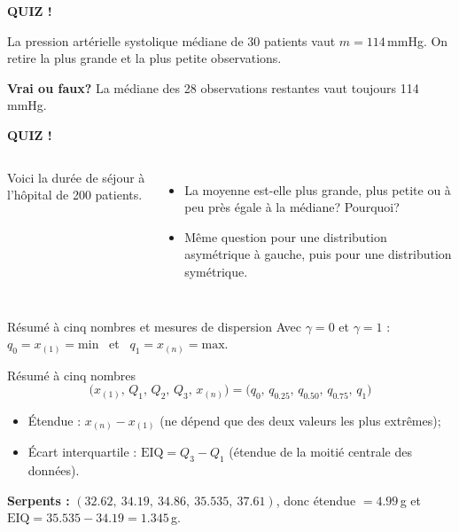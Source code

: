 \documentclass{BeamerTemplate}
\begin{document}
\begin{frame}[plain,t]
  \centerline{\LARGE\bfseries\alert{QUIZ !}}

  \medskip
  La pression artérielle systolique \alert{médiane} de 30 patients vaut
  $m = 114$\,mmHg. On retire la plus grande et la plus petite observations.

  \bigskip
  \textbf{Vrai ou faux?} La médiane des 28 observations restantes vaut
  toujours 114\,mmHg.

  \vspace{3cm}
\end{frame}

\begin{frame}[plain,t]
  \centerline{\LARGE\bfseries\alert{QUIZ !}}

  \medskip
  \begin{columns}[T]
    Voici la durée de séjour à l'hôpital de 200 patients.

    \begin{itemize}\itemsep 1.2cm
      \item La moyenne est-elle plus grande, plus petite ou à peu près égale
        à la médiane? Pourquoi?
      \item<2-> Même question pour une distribution asymétrique à gauche,
        puis pour une distribution symétrique.
    \end{itemize}
  \end{columns}
\end{frame}

\begin{frame}[t]{Résumé à cinq nombres et mesures de dispersion}
  Avec $\gamma = 0$ et $\gamma = 1$ :
  $q_0 = x_{(1)} = \text{min}$ \ et \ $q_1 = x_{(n)} = \text{max}$.

  \begin{Boite}{Résumé à cinq nombres}
    \[ \big(x_{(1)},\, Q_1,\, Q_2,\, Q_3,\, x_{(n)}\big)
       = \big(q_{0},\, q_{0.25},\, q_{0.50},\, q_{0.75},\, q_{1}\big) \]
  \end{Boite}

  \begin{itemize}
    \item \alert{Étendue} : $x_{(n)} - x_{(1)}$ (ne dépend que des deux
      valeurs les plus extrêmes);
    \item \alert{Écart interquartile} : $\text{EIQ} = Q_3 - Q_1$ (étendue de
      la moitié centrale des données).
  \end{itemize}


  \textbf{Serpents :} $(32.62,\ 34.19,\ 34.86,\ 35.535,\ 37.61)$, donc
  étendue $= 4.99$\,g et $\text{EIQ} = 35.535 - 34.19 = 1.345$\,g.

\end{frame}
\end{document}
